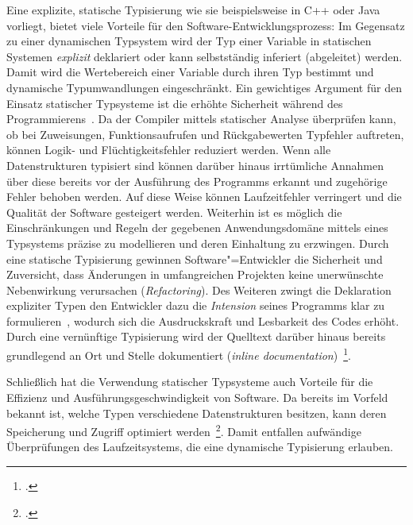 Eine explizite, statische Typisierung wie sie beispielsweise in C++ oder Java vorliegt, bietet viele Vorteile für den Software-Entwicklungsprozess: Im Gegensatz zu einer dynamischen Typsystem wird der Typ einer Variable in statischen Systemen \emph{explizit} deklariert oder kann selbstständig inferiert (abgeleitet) werden. Damit wird die Wertebereich einer Variable durch ihren Typ bestimmt und dynamische Typumwandlungen eingeschränkt.
Ein gewichtiges Argument für den Einsatz statischer Typsysteme ist die erhöhte Sicherheit während des Programmierens~\autocite{CORNELL:STRONG_TYPING}. Da der Compiler mittels statischer Analyse überprüfen kann, ob bei Zuweisungen, Funktionsaufrufen und Rückgabewerten Typfehler auftreten, können Logik- und Flüchtigkeitsfehler reduziert werden. Wenn alle Datenstrukturen typisiert sind können darüber hinaus irrtümliche Annahmen über diese bereits vor der Ausführung des Programms erkannt und zugehörige Fehler behoben werden. Auf diese Weise können Laufzeitfehler verringert und die Qualität der Software gesteigert werden. Weiterhin ist es möglich die Einschränkungen und Regeln der gegebenen Anwendungsdomäne mittels eines Typsystems präzise zu modellieren und deren Einhaltung zu erzwingen. Durch eine statische Typisierung gewinnen Software"=Entwickler die Sicherheit und Zuversicht, dass Änderungen in umfangreichen Projekten keine unerwünschte Nebenwirkung verursachen (\textit{Refactoring}).
Des Weiteren zwingt die Deklaration expliziter Typen den Entwickler dazu die \emph{Intension} seines Programms klar zu formulieren~\autocite[96]{WALDMANN:PPS}, wodurch sich die Ausdruckskraft und Lesbarkeit des Codes erhöht. Durch eine vernünftige Typisierung wird der Quelltext darüber hinaus bereits grundlegend an Ort und Stelle dokumentiert (\textit{inline documentation})~\footcite[Abschnitt 6.1.1]{MITCHELL:CONCEPTS}.

Schließlich hat die Verwendung statischer Typsysteme auch Vorteile für die Effizienz und Ausführungsgeschwindigkeit von Software. Da bereits im Vorfeld bekannt ist, welche Typen verschiedene Datenstrukturen besitzen, kann deren Speicherung und Zugriff optimiert werden~\footcite[Abschnitt 6.1.3]{MITCHELL:CONCEPTS}. Damit entfallen aufwändige Überprüfungen des Laufzeitsystems, die eine dynamische Typisierung erlauben.

